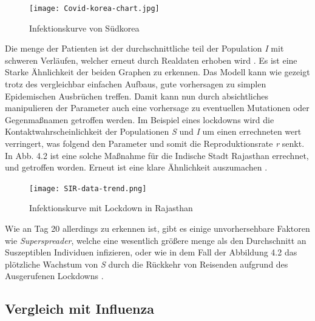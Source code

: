 \documentclass[12pt]{scrartcl} %
\begin{document}
	\begin{figure}[h]
	\centering
	\texttt{[image: Covid-korea-chart.jpg]}
	\caption[Infektionskurve von Südkorea,\newline https://cmte.ieee.org/futuredirections/tech-policy-ethics/may-2020/covid-19-disease-modelling-and-its-impact-on-public-health-policy/]{Infektionskurve von Südkorea}
	\end{figure}
	
	\newpage
	
 Die menge der Patienten ist der durchschnittliche teil der Population \textit{I} mit schweren Verläufen, welcher erneut durch Realdaten erhoben wird \cite{3}. Es ist eine Starke Ähnlichkeit der beiden Graphen zu erkennen. Das Modell kann wie gezeigt trotz des vergleichbar einfachen Aufbaus, gute vorhersagen zu simplen Epidemischen Ausbrüchen treffen.
Damit kann nun durch absichtliches manipulieren der Parameter auch eine vorhersage zu eventuellen Mutationen oder Gegenmaßnamen getroffen werden. Im Beispiel eines lockdowns wird die Kontaktwahrscheinlichkeit der Populationen \textit{S} und \textit{I} um einen errechneten wert verringert, was folgend den Parameter \textbeta\space und somit die Reproduktionsrate \textit{r} senkt. In Abb. 4.2 ist eine solche Maßnahme für die Indische Stadt Rajasthan errechnet, und getroffen worden. Erneut ist eine klare Ähnlichkeit auszumachen \cite{3, 10, 11}.
	
	\begin{figure}[h]
	\centering
	\texttt{[image: SIR-data-trend.png]}
	\caption[Infektionskurve mit Lockdown in Rajasthan,\newline Entnommen aus: \cite{3}]{Infektionskurve mit Lockdown in Rajasthan}
	\end{figure}
	
	Wie an Tag 20 allerdings zu erkennen ist, gibt es einige unvorhersehbare Faktoren wie \textsl{Superspreader}, welche eine wesentlich größere menge als den Durchschnitt an Suszeptiblen Individuen infizieren, oder wie in dem Fall der Abbildung 4.2 das plötzliche Wachstum von \textsl{S} durch die Rückkehr von Reisenden aufgrund des Ausgerufenen Lockdowns \cite{3, 11}.


\subsection{Vergleich mit Influenza}
\end{document}
